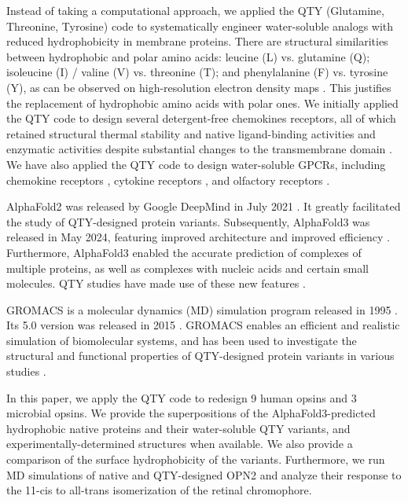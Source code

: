\documentclass[fleqn,10pt]{manuscript}
\begin{document}
Instead of taking a computational approach, we applied the QTY (Glutamine, Threonine, Tyrosine) code to systematically engineer water-soluble analogs with reduced hydrophobicity in membrane proteins. There are structural similarities between hydrophobic and polar amino acids: leucine (L) vs. glutamine (Q); isoleucine (I) / valine (V) vs. threonine (T); and phenylalanine (F) vs. tyrosine (Y), as can be observed on high-resolution electron density maps \citep{Zhang_2018, Zhang_2022, Tegler_2020}. This justifies the replacement of hydrophobic amino acids with polar ones. We initially applied the QTY code to design several detergent-free chemokines receptors, all of which retained structural thermal stability and native ligand-binding activities and enzymatic activities despite substantial changes to the transmembrane domain \citep{Zhang_2018, Tegler_2020}. We have also applied the QTY code to design water-soluble GPCRs, including chemokine receptors \citep{Zhang_2018, Qing_2019, Tegler_2020, Skuhersky_2021}, cytokine receptors \citep{Hao_2020}, and olfactory receptors \citep{Skuhersky_2021, Johnsson_2025}. 

AlphaFold2 was released by Google DeepMind in July 2021 \citep{Jumper_2021}. It greatly facilitated the study of QTY-designed protein variants. Subsequently, AlphaFold3 was released in May 2024, featuring improved architecture and improved efficiency \citep{Abramson_2024}. Furthermore, AlphaFold3 enabled the accurate prediction of complexes of multiple proteins, as well as complexes with nucleic acids and certain small molecules. QTY studies have made use of these new features \citep{Chen_2025, Johnsson_2025}. 

GROMACS is a molecular dynamics (MD) simulation program released in 1995 \citep{Berendsen_1995}. Its 5.0 version was released in 2015 \citep{Abraham_2015}. GROMACS enables an efficient and realistic simulation of biomolecular systems, and has been used to investigate the structural and functional properties of QTY-designed protein variants in various studies \citep{Karagol_2024, Li_Tang_2024, Smorodina_2024, Li_Wang_2024, Johnsson_2025}. 

In this paper, we apply the QTY code to redesign 9 human opsins and 3 microbial opsins. We provide the superpositions of the AlphaFold3-predicted hydrophobic native proteins and their water-soluble QTY variants, and experimentally-determined structures when available. We also provide a comparison of the surface hydrophobicity of the variants. Furthermore, we run MD simulations of native and QTY-designed OPN2 and analyze their response to the 11-cis to all-trans isomerization of the retinal chromophore. 
\end{document}
